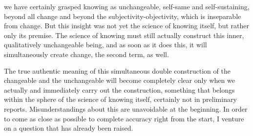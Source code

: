 
we have certainly grasped knowing
as unchangeable, self-same and self-sustaining,
beyond all change and beyond the subjectivity-objectivity,
which is inseparable from change.
But this insight was not yet the science of knowing itself,
but rather only its premise.
The science of knowing must still actually construct
this inner, qualitatively unchangeable being,
and as soon as it does this,
it will simultaneously create change,
the second term, as well.

The true authentic meaning of this
simultaneous double construction
of the changeable and the unchangeable
will become completely clear
only when we actually and immediately
carry out the construction,
something that belongs within the sphere
of the science of knowing itself,
certainly not in preliminary reports.
Misunderstandings about this are unavoidable at the beginning.
In order to come as close as possible to
complete accuracy right from the start,
I venture on a question that has already been raised.

